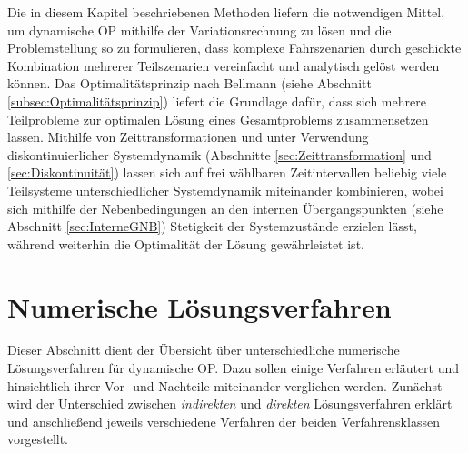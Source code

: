 Die in diesem Kapitel beschriebenen Methoden liefern die notwendigen Mittel, um dynamische \gls{OP} mithilfe der Variationsrechnung zu lösen und die Problemstellung so zu formulieren, dass komplexe Fahrszenarien durch geschickte Kombination mehrerer Teilszenarien vereinfacht und analytisch gelöst werden können. Das Optimalitätsprinzip nach Bellmann (siehe Abschnitt \ref{subsec:Optimalitätsprinzip}) liefert die Grundlage dafür, dass sich mehrere Teilprobleme zur optimalen Lösung eines Gesamtproblems zusammensetzen lassen. Mithilfe von Zeittransformationen und unter Verwendung diskontinuierlicher Systemdynamik (Abschnitte \ref{sec:Zeittransformation} und \ref{sec:Diskontinuität}) lassen sich auf frei wählbaren Zeitintervallen beliebig viele Teilsysteme unterschiedlicher Systemdynamik miteinander kombinieren, wobei sich mithilfe der Nebenbedingungen an den internen Übergangspunkten (siehe Abschnitt \ref{sec:InterneGNB}) Stetigkeit der Systemzustände erzielen lässt, während weiterhin die Optimalität der Lösung gewährleistet ist.
\section{Numerische Lösungsverfahren}\label{sec:Lösungsverfahren}
Dieser Abschnitt dient der Übersicht über unterschiedliche numerische Lösungsverfahren für dynamische \gls{OP}. Dazu sollen einige Verfahren erläutert und hinsichtlich ihrer Vor- und Nachteile miteinander verglichen werden. Zunächst wird der Unterschied zwischen \textit{indirekten} und \textit{direkten} Lösungsverfahren erklärt und anschließend jeweils verschiedene Verfahren der beiden Verfahrensklassen vorgestellt.
